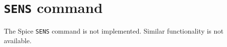\section{{\tt SENS} command}
The Spice {\tt SENS} command is not implemented.  Similar
functionality is not available.
